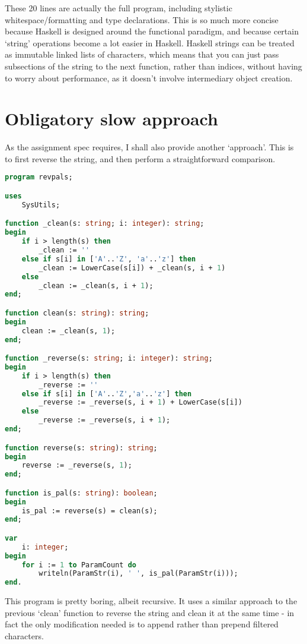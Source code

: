 \documentclass{article}
\begin{document}
\iffalse $ \fi %

    These 20 lines are actually the full program, including stylistic
    whitespace/formatting and type declarations. This is so much more concise
    because Haskell is designed around the functional paradigm, and because
    certain `string' operations become a lot easier in Haskell. Haskell strings
    can be treated as immutable linked lists of characters, which means that
    you can just pass subsections of the string to the next function, rather
    than indices, without having to worry about performance, as it doesn't
    involve intermediary object creation.

    \section{Obligatory slow approach}

    As the assignment spec requires, I shall also provide another `approach'.
    This is to first reverse the string, and then perform a straightforward
    comparison.

\begin{lstlisting}[language=Pascal, caption=Method by string reversal]
program revpals;

uses
    SysUtils;

function _clean(s: string; i: integer): string;
begin
    if i > length(s) then
        _clean := ''
    else if s[i] in ['A'..'Z', 'a'..'z'] then
        _clean := LowerCase(s[i]) + _clean(s, i + 1)
    else
        _clean := _clean(s, i + 1);
end;

function clean(s: string): string;
begin
    clean := _clean(s, 1);
end;

function _reverse(s: string; i: integer): string;
begin
    if i > length(s) then
        _reverse := ''
    else if s[i] in ['A'..'Z','a'..'z'] then
        _reverse := _reverse(s, i + 1) + LowerCase(s[i])
    else
        _reverse := _reverse(s, i + 1);
end;

function reverse(s: string): string;
begin
    reverse := _reverse(s, 1);
end;

function is_pal(s: string): boolean;
begin
    is_pal := reverse(s) = clean(s);
end;

var
    i: integer;
begin
    for i := 1 to ParamCount do
        writeln(ParamStr(i), ' ', is_pal(ParamStr(i)));
end.
\end{lstlisting}

    This program is pretty boring, albeit recursive. It uses a similar approach
    to the previous `clean' function to reverse the string and clean it at the
    same time - in fact the only modification needed is to append rather than
    prepend filtered characters.
\end{document}
